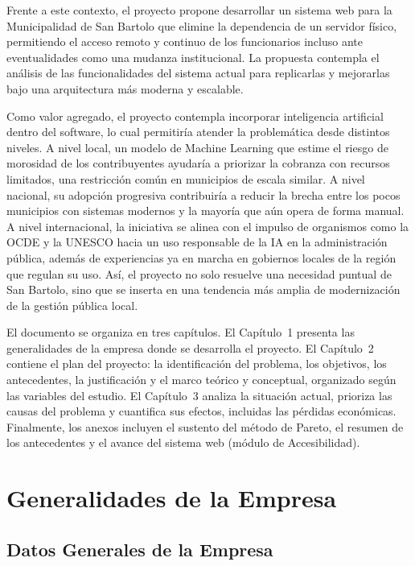 \documentclass[12pt,a4paper]{report}
\newcounter{anexo}
\begin{document}
Frente a este contexto, el proyecto propone desarrollar un sistema web para la Municipalidad de San Bartolo que elimine la dependencia de un servidor físico, permitiendo el acceso remoto y continuo de los funcionarios incluso ante eventualidades como una mudanza institucional. La propuesta contempla el análisis de las funcionalidades del sistema actual para replicarlas y mejorarlas bajo una arquitectura más moderna y escalable.

Como valor agregado, el proyecto contempla incorporar inteligencia artificial dentro del software, lo cual permitiría atender la problemática desde distintos niveles. A nivel local, un modelo de Machine Learning que estime el riesgo de morosidad de los contribuyentes ayudaría a priorizar la cobranza con recursos limitados, una restricción común en municipios de escala similar. A nivel nacional, su adopción progresiva contribuiría a reducir la brecha entre los pocos municipios con sistemas modernos y la mayoría que aún opera de forma manual. A nivel internacional, la iniciativa se alinea con el impulso de organismos como la OCDE y la UNESCO hacia un uso responsable de la IA en la administración pública, además de experiencias ya en marcha en gobiernos locales de la región que regulan su uso. Así, el proyecto no solo resuelve una necesidad puntual de San Bartolo, sino que se inserta en una tendencia más amplia de modernización de la gestión pública local.

El documento se organiza en tres capítulos. El Capítulo~1 presenta las generalidades de la empresa donde se desarrolla el proyecto. El Capítulo~2 contiene el plan del proyecto: la identificación del problema, los objetivos, los antecedentes, la justificación y el marco teórico y conceptual, organizado según las variables del estudio. El Capítulo~3 analiza la situación actual, prioriza las causas del problema y cuantifica sus efectos, incluidas las pérdidas económicas. Finalmente, los anexos incluyen el sustento del método de Pareto, el resumen de los antecedentes y el avance del sistema web (módulo de Accesibilidad).

\chapter{Generalidades de la Empresa}

\section{Datos Generales de la Empresa}
\end{document}
